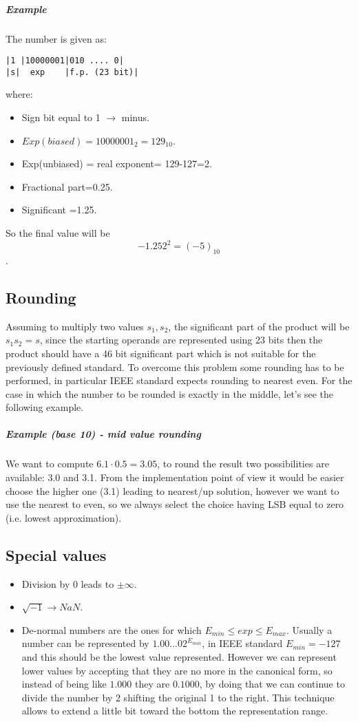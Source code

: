 \subparagraph{Example}
The number is given as:
\begin{verbatim}
|1 |10000001|010 .... 0|
|s|  exp    |f.p. (23 bit)|
\end{verbatim}
where:

\begin{itemize}
  \item Sign bit equal to  1 $\rightarrow$ minus.
  \item $Exp(biased) = 10000001_2 = 129_{10}$.
  \item Exp(unbiased) = real exponent= 129-127=2.
  \item Fractional part=0.25.
  \item Significant    =1.25.
\end{itemize}

So the final value will be $$-1.25 2^2 = (-5)_{10}$$.

\subsection{Rounding}
Assuming to multiply two values $s_1, s_2$, the significant part of the product
will be $s_1 s_2 = s$, since the starting operands are represented using 23
bits then the product should have a 46 bit significant part which is not
suitable for the previously defined standard. To overcome this problem some
rounding has to be performed, in particular IEEE standard expects rounding to
nearest even. For the case in which the number to be rounded is exactly in the
middle, let's see the following example.

\subparagraph{Example (base 10) - mid value rounding}
We want to compute $6.1 \cdot 0.5 =3.05$, to round the result two possibilities
are available: 3.0 and 3.1.
From the implementation point of view it would be easier choose the higher one
(3.1) leading to nearest/up solution, however we want to use the nearest to
even, so we always select the choice having LSB equal to zero (i.e. lowest
approximation).

\subsection{Special values}
\begin{itemize}
  \item Division by 0 leads to  $\pm \infty$.
  \item $\sqrt{-1} \rightarrow NaN$.
  \item De-normal numbers are the ones for which $E_{min} \leq exp \leq
  E_{max}$. Usually a number can be represented by $1.00...0 2^{E_{min}}$, in
  IEEE standard $E_{min}=-127$ and this should be the lowest value
  represented. However we can represent lower values by accepting that they
  are no more in the canonical form, so instead of being like $1.000$ they
  are $0.1000$, by doing that we can continue to divide the number by 2
  shifting the original 1 to the right. This technique allows to extend a
  little bit toward the bottom the representation range.
\end{itemize}

